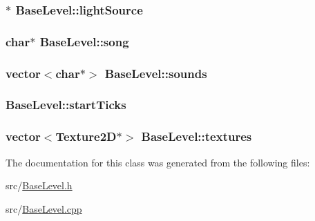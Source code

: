\hypertarget{class_base_level_ac2ce7bd8b6bf7fbb16b95e89a244aaf4}{
\subsubsection[{light\-Source}]{$\ast$ Base\-Level\-::light\-Source}}\label{class_base_level_ac2ce7bd8b6bf7fbb16b95e89a244aaf4}
\hypertarget{class_base_level_a5b530914c467f446a16dc02b3832accc}{
\subsubsection[{song}]{\setlength{\rightskip}{0pt plus 5cm}char$\ast$ Base\-Level\-::song}}\label{class_base_level_a5b530914c467f446a16dc02b3832accc}
\hypertarget{class_base_level_a9d7bf47d2afa3ec76b5063983f731ade}{
\subsubsection[{sounds}]{\setlength{\rightskip}{0pt plus 5cm}vector$<$char$\ast$$>$ Base\-Level\-::sounds}}\label{class_base_level_a9d7bf47d2afa3ec76b5063983f731ade}
\hypertarget{class_base_level_ab9eced0d307091b7ff45196f72ba4106}{
\subsubsection[{start\-Ticks}]{ Base\-Level\-::start\-Ticks}}\label{class_base_level_ab9eced0d307091b7ff45196f72ba4106}
\hypertarget{class_base_level_a60999fc099739ff1c592c23148bec541}{
\subsubsection[{textures}]{\setlength{\rightskip}{0pt plus 5cm}vector$<${\bf Texture2\-D}$\ast$$>$ Base\-Level\-::textures}}\label{class_base_level_a60999fc099739ff1c592c23148bec541}


The documentation for this class was generated from the following files\-:\begin{DoxyCompactItemize}
\item 
src/\hyperlink{_base_level_8h}{Base\-Level.\-h}\item 
src/\hyperlink{_base_level_8cpp}{Base\-Level.\-cpp}\end{DoxyCompactItemize}

